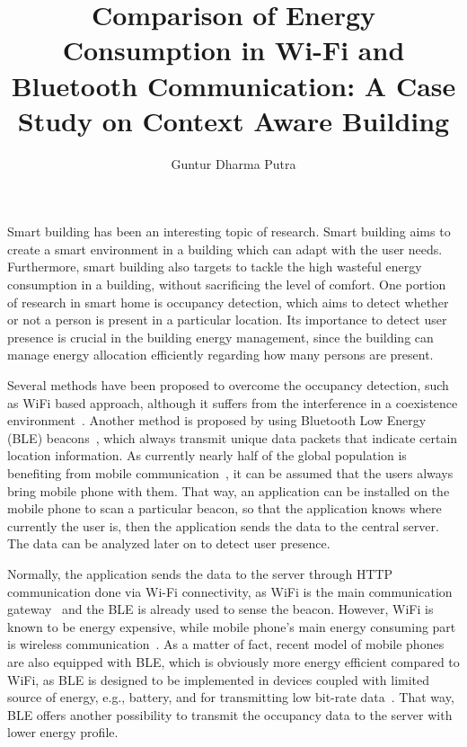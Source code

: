 \documentclass[journal]{vgtc}                %
\title{Comparison of Energy Consumption in Wi-Fi and Bluetooth Communication: A Case Study on Context Aware Building}
\author{Guntur Dharma Putra}
\begin{document}


\maketitle
Smart building has been an interesting topic of research. Smart building aims to create a smart environment in a building which can adapt with the user needs. Furthermore, smart building also targets to tackle the high wasteful energy consumption in a building, without sacrificing the level of comfort. One portion of research in smart home is occupancy detection, which aims to detect whether or not a person is present in a particular location. Its importance to detect user presence is crucial in the building energy management, since the building can manage energy allocation efficiently regarding how many persons are present.

Several methods have been proposed to overcome the occupancy detection, such as WiFi based approach, although it suffers from the interference in a coexistence environment~\cite{Pei2012}. Another method is proposed by using Bluetooth Low Energy (BLE) beacons~\cite{Conte2014}, which always transmit unique data packets that indicate certain location information. As currently nearly half of the global population is benefiting from mobile communication~\cite{Fowdur2016}, it can be assumed that the users always bring mobile phone with them. That way, an application can be installed on the mobile phone to scan a particular beacon, so that the application knows where currently the user is, then the application sends the data to the central server. The data can be analyzed later on to detect user presence.

Normally, the application sends the data to the server through HTTP communication done via Wi-Fi connectivity, as WiFi is the main communication gateway~\cite{Fowdur2016} and the BLE is already used to sense the beacon. However, WiFi is known to be energy expensive, while mobile phone's main energy consuming part is wireless communication~\cite{Fowdur2016,Crk2009}. As a matter of fact, recent model of mobile phones are also equipped with BLE, which is obviously more energy efficient compared to WiFi, as BLE is designed to be implemented in devices coupled with limited source of energy, e.g., battery, and for transmitting low bit-rate data~\cite{Friedman2013}. That way, BLE offers another possibility to transmit the occupancy data to the server with lower energy profile.
\end{document}
